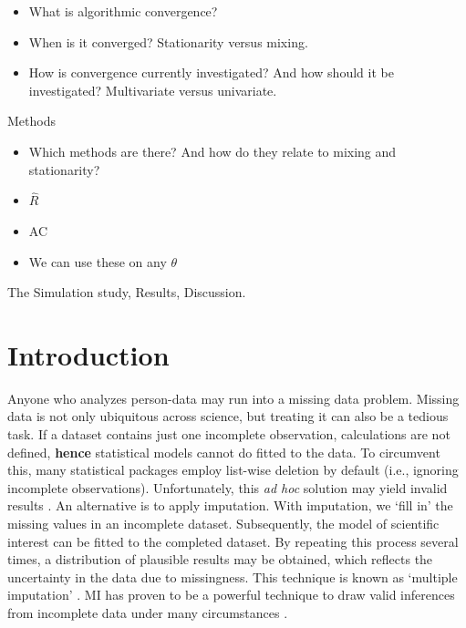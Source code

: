 \documentclass[Royal,times,sageh]{sagej}
\begin{document}
\begin{itemize}
\item
  What is algorithmic convergence?
\item
  When is it converged? Stationarity versus mixing.
\item
  How is convergence currently investigated? And how should it be investigated? Multivariate versus univariate.
\end{itemize}

Methods

\begin{itemize}
\item
  Which methods are there? And how do they relate to mixing and stationarity?
\item
  \(\widehat{R}\)
\item
  AC
\item
  We can use these on any \(\theta\)
\end{itemize}

The Simulation study, Results, Discussion.

\hypertarget{introduction}{%
\section{Introduction}\label{introduction}}

Anyone who analyzes person-data may run into a missing data problem. Missing data is not only ubiquitous across science, but treating it can also be a tedious task. If a dataset contains just one incomplete observation, calculations are not defined, \textbf{hence} statistical models cannot do fitted to the data. To circumvent this, many statistical packages employ list-wise deletion by default (i.e., ignoring incomplete observations). Unfortunately, this \emph{ad hoc} solution may yield invalid results \citep{buur18}. An alternative is to apply imputation. With imputation, we `fill in' the missing values in an incomplete dataset. Subsequently, the model of scientific interest can be fitted to the completed dataset. By repeating this process several times, a distribution of plausible results may be obtained, which reflects the uncertainty in the data due to missingness. This technique is known as `multiple imputation' \citep[MI;][]{rubin76}. MI has proven to be a powerful technique to draw valid inferences from incomplete data under many circumstances \citep{buur18}.
\end{document}
